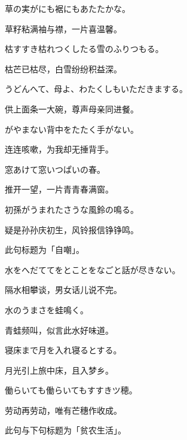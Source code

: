 \begin{haiku}
    {\FH 草の実がにも裾にもあたたかな。}

    {\FK 草籽粘满袖与襟，一片喜温馨。}
\end{haiku}

\begin{haiku}
    {\FH 枯すすき枯れつくしたる雪のふりつもる。}

    {\FK 枯芒已枯尽，白雪纷纷积益深。}
\end{haiku}

\begin{haiku}
    {\FH うどんへて、母よ、わたくしもいただきまする。}

    {\FK 供上面条一大碗，尊声母亲同进餐。}
\end{haiku}

\begin{haiku}
    {\FH {}がやまない背中をたたく手がない。}

    {\FK 连连咳嗽，为我却无捶背手。}
\end{haiku}

\begin{haiku}
    {\FH 窓あけて窓いつぱいの春。}

    {\FK 推开一望，一片青青春满窗。}
\end{haiku}

\begin{haiku}
    {\FH 初孫がうまれたさうな風鈴の鳴る。}

    {\FK 疑是孙孙庆初生，风铃报信铮铮鸣。}

    {\FS 此句标题为「自嘲」。}
\end{haiku}

\begin{haiku}
    {\FH 水をへだててをとことをなごと話が尽きない。}

    {\FK 隔水相攀谈，男女话儿说不完。}
\end{haiku}

\begin{haiku}
    {\FH 水のうまさを蛙鳴く。}

    {\FK 青蛙频叫，似言此水好味道。}
\end{haiku}

\begin{haiku}
    {\FH 寝床まで月を入れ寝るとする。}

    {\FK 月光引上旅中床，且入梦乡。}
\end{haiku}

\begin{haiku}
    {\FH 働らいても働らいてもすすきツ穂。}

    {\FK 劳动再劳动，唯有芒穗作收成。}

    {\FS 此句与下句标题为「贫农生活」。}
\end{haiku}

